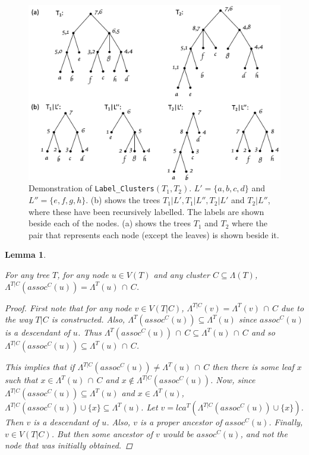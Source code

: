 \documentclass{article}
\newcommand{\leafset}{\Lambda}
\newtheorem{assocnode}[incompatibility]{Lemma}
\begin{document}
    \begin{figure}[h]
        \includegraphics[scale=0.5]{labelclusters}
        \centering
        \caption{Demonstration of \texttt{Label\_Clusters}$(T_1, T_2)$. $L' = \{a, b, c, d\}$ and $L'' = \{e, f, g, h\}$. (b) shows the trees $T_1|L', T_1|L'', T_2|L'$ and $T_2|L''$, where these have been recursively labelled. The labels are shown beside each of the nodes. (a) shows the trees $T_1$ and $T_2$ where the pair that represents each node (except the leaves) is shown beside it.}
        \label{fig:labelclusters}
    \end{figure}

    \bigskip
    \begin{assocnode}
        \label{lem:assocnode}

        For any tree $T$, for any node $u \in V(T)$ and any cluster $C \subseteq \leafset(T)$, $\leafset^{T|C}(assoc^C(u)) = \leafset^{T}(u)\, \cap\, C$.

        \begin{proof}
            First note that for any node $v \in V(T|C)$, $\leafset^{T|C}(v) = \leafset^{T}(v)\, \cap\, C$ due to the way $T|C$ is constructed. Also, $\leafset^{T}(assoc^C(u)) \subseteq \leafset^{T}(u)$ since $assoc^C(u)$ is a descendant of $u$. Thus $\leafset^{T}(assoc^C(u))\, \cap\, C \subseteq \leafset^{T}(u)\, \cap\, C$ and so $\leafset^{T|C}(assoc^C(u)) \subseteq \leafset^{T}(u)\, \cap\, C$.

            This implies that if $\leafset^{T|C}(assoc^C(u)) \neq \leafset^{T}(u)\, \cap\, C$ then there is some leaf $x$ such that $x \in \leafset^{T}(u)\, \cap\, C$ and $x \not\in \leafset^{T|C}(assoc^C(u))$. Now, since $\leafset^{T|C}(assoc^C(u)) \subseteq \leafset^{T}(u)$ and $x \in \leafset^{T}(u)$, $\leafset^{T|C}(assoc^C(u)) \cup \{x\} \subseteq \leafset^{T}(u)$. Let $v = lca^T(\leafset^{T|C}(assoc^C(u)) \cup \{x\})$. Then $v$ is a descendant of $u$. Also, $v$ is a proper ancestor of $assoc^C(u)$. Finally, $v \in V(T|C)$. But then some ancestor of $v$ would be $assoc^C(u)$, and not the node that was initially obtained.
        \end{proof}
    \end{assocnode}
\end{document}

